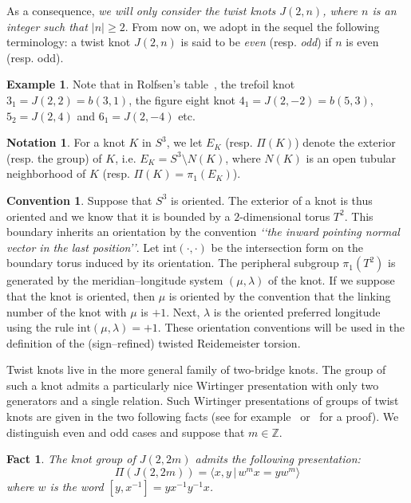 \documentclass[a4paper]{amsart}
\theoremstyle{plain}
\newtheorem{fact}[theorem]{Fact}
\theoremstyle{definition}
\newtheorem*{example*}{Example}
\newtheorem*{notation*}{Notation}
\newtheorem*{convention*}{Convention}
\theoremstyle{remark}
\newcommand{\ZZ}{{\mathbb Z}}
\begin{document}
As a consequence,  
\emph{we will only consider the twist knots $J(2, n)$, 
where $n$ is an integer such that $|n| \geqslant 2$}. 
From now on, we adopt in the sequel the following terminology: 
a twist knot $J(2, n)$ is said to be \emph{even} (resp. \emph{odd}) 
if $n$ is even (resp. odd).  


\begin{example*}
Note that in Rolfsen's table~\cite{Rolfsen}, 
the trefoil knot $3_1 = J(2, 2) = b(3, 1)$, 
the figure eight knot $4_1 = J(2, -2) = b(5,3)$, $5_2 = J(2, 4)$ and $6_1 = J(2, -4)$ etc.
\end{example*}


\begin{notation*}
For a knot $K$ in $S^3$, we let $E_K$ (resp. $\Pi(K)$) 
denote the exterior (resp. the group) of $K$, 
i.e. $E_K = S^3 \setminus N(K)$, 
where $N(K)$ is an open tubular neighborhood of $K$ 
(resp. $\Pi(K) = \pi_1(E_K)$). 
\end{notation*}

\begin{convention*}
Suppose that $S^3$ is oriented. The exterior of a knot is thus oriented and we know that it is bounded 
by a $2$-dimensional torus $T^2$. 
This boundary inherits an orientation by the convention 
\emph{\lq\lq the inward pointing normal vector in the last position\rq\rq}. 
Let $\mathrm{int}(\cdot, \cdot)$ be 
the intersection form on the boundary torus induced by its orientation. 
The peripheral subgroup $\pi_1(T^2)$ is generated by 
the meridian--longitude system $(\mu, \lambda)$ of the knot. 
If we suppose that the knot is oriented, 
then $\mu$ is oriented by the convention that 
the linking number of the knot with $\mu$ is $+1$. 
Next, $\lambda$ is the oriented preferred longitude 
using the rule $\mathrm{int}(\mu, \lambda) = +1$. These orientation conventions will be used in the definition of the {(sign--refined)} twisted Reidemeister torsion.
\end{convention*}
 
 Twist knots live in the more general family of two-bridge knots. 
The group of such a knot admits 
a particularly nice Wirtinger presentation with only two generators and a single relation. 
Such Wirtinger presentations of groups of twist knots  
are given in the two following facts (see for example~\cite{Rolfsen} or~\cite{HS} for a proof). 
We distinguish even and odd cases and suppose that $m \in \ZZ$.
\begin{fact}\label{Fact1}   
    The knot group of $J(2, 2m)$ admits the following presentation:
\begin{equation}\label{Pi1even}
\Pi(J(2, 2m))
=
\langle
x, y \,|\, w^{m} x = y w^{m}
\rangle
\end{equation}
where $w$ is the word $[y, x^{-1}] = yx^{-1}y^{-1}x$.
\end{fact}
\end{document}
